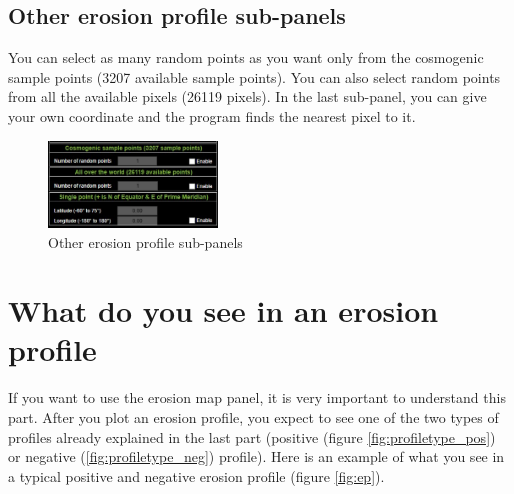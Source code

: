 \documentclass[11pt,a4paper,titlepage]{report}
\begin{document}
\subsection{Other erosion profile sub-panels}
You can select as many random points as you want only from the cosmogenic sample points (3207 available sample points). You can also select random points from all the available pixels (26119 pixels). In the last sub-panel, you can give your own coordinate and the program finds the nearest pixel to it.

\begin{figure}[H]
    \centering
    \includegraphics[width=0.4\textwidth]{epothers.jpg}
    \caption[Other erosion profile sub-panels]{Other erosion profile sub-panels}
    \label{fig:epstat}    
\end{figure}

\section{What do you see in an erosion profile}\label{sec:ep}
If you want to use the erosion map panel, it is very important to understand this part. After you plot an erosion profile, you expect to see one of the two types of profiles already explained in the last part (positive (figure \ref{fig:profiletype_pos}) or negative (\ref{fig:profiletype_neg}) profile). Here is an example of what you see in a typical positive and negative erosion profile (figure \ref{fig:ep}).\\
\end{document}
